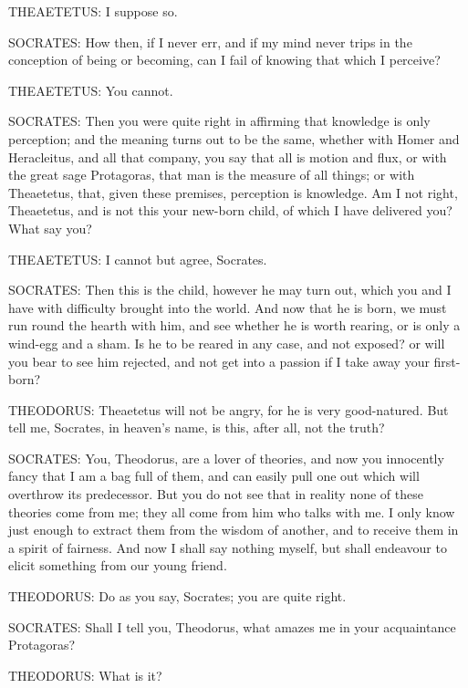 THEAETETUS: I suppose so.

SOCRATES: How then, if I never err, and if my mind never trips in the
conception of being or becoming, can I fail of knowing that which I
perceive?

THEAETETUS: You cannot.

SOCRATES: Then you were quite right in affirming that knowledge is only
perception; and the meaning turns out to be the same, whether with Homer
and Heracleitus, and all that company, you say that all is motion and
flux, or with the great sage Protagoras, that man is the measure of all
things; or with Theaetetus, that, given these premises, perception is
knowledge. Am I not right, Theaetetus, and is not this your new-born
child, of which I have delivered you? What say you?

THEAETETUS: I cannot but agree, Socrates.

SOCRATES: Then this is the child, however he may turn out, which you and
I have with difficulty brought into the world. And now that he is born,
we must run round the hearth with him, and see whether he is worth
rearing, or is only a wind-egg and a sham. Is he to be reared in any
case, and not exposed? or will you bear to see him rejected, and not get
into a passion if I take away your first-born?

THEODORUS: Theaetetus will not be angry, for he is very good-natured.
But tell me, Socrates, in heaven's name, is this, after all, not the
truth?

SOCRATES: You, Theodorus, are a lover of theories, and now you
innocently fancy that I am a bag full of them, and can easily pull one
out which will overthrow its predecessor. But you do not see that in
reality none of these theories come from me; they all come from him who
talks with me. I only know just enough to extract them from the wisdom
of another, and to receive them in a spirit of fairness. And now I shall
say nothing myself, but shall endeavour to elicit something from our
young friend.

THEODORUS: Do as you say, Socrates; you are quite right.

SOCRATES: Shall I tell you, Theodorus, what amazes me in your
acquaintance Protagoras?

THEODORUS: What is it?

